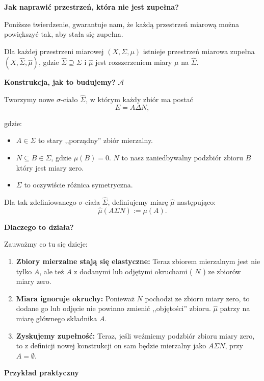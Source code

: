 \noindent\textbf{Jak naprawić przestrzeń, która nie jest zupełna?} 

Poniższe twierdzenie, gwarantuje nam, że każdą przestrzeń miarową można powiększyć tak, aby stała się zupełna.
\begin{theorem}
	Dla każdej przestrzeni miarowej $\left( X,\Sigma, \mu \right) $ istnieje przestrzeń miarowa zupełna $\left( X, \hat{\Sigma}, \hat{\mu} \right) $, gdzie $\hat{\Sigma}\supseteq \Sigma$ i $\hat{\mu}$ jest rozszerzeniem miary  $\mu$ na $\hat{\Sigma}.$
\end{theorem} 

\noindent \textbf{Konstrukcja, jak to budujemy?} $\mathcal{A} $

Tworzymy nowe $\sigma $-ciało $\hat{\Sigma }$, w którym każdy zbiór ma postać
\[
E = A \Delta N
,\]

gdzie:
\begin{itemize}
	\item $A \in \Sigma $ to stary ,,porządny'' zbiór mierzalny.
	\item $N \subseteq  B \in \Sigma $, gdzie $\mu\left( B \right) = 0$. $N$ to nasz zaniedbywalny podzbiór zbioru $B$ który jest miary zero.
	\item $\Sigma $ to oczywiście różnica symetryczna.
\end{itemize}

Dla tak zdefiniowanego $\sigma $-ciała $\hat{\Sigma }$, definiujemy miarę $\hat{\mu}$ następująco:
\[
\hat{\mu}\left( A \Sigma N \right) := \mu\left( A \right) 
.\] 

\noindent \textbf{Dlaczego to działa?} 

Zauważmy co tu się dzieje:
\begin{enumerate}[label=\arabic*.]
	\item \textbf{Zbiory mierzalne stają się elastyczne:} Teraz zbiorem mierzalnym jest nie tylko $A$, ale też $A$ z dodanymi lub odjętymi okruchami ( $N$ ) ze zbiorów miary zero.
	\item \textbf{Miara ignoruje okruchy:} Ponieważ $N$ pochodzi ze zbioru miary zero, to dodane go lub odjęcie nie powinno zmienić ,,objętości'' zbioru. $\hat{\mu}$ patrzy na miarę głównego składnika $A$.
	\item \textbf{Zyskujemy zupełność:} Teraz, jeśli weźmiemy podzbiór zbioru miary zero, to z definicji nowej konstrukcji on sam będzie mierzalny jako $A \Sigma N$, przy $A = \emptyset $.
\end{enumerate}

\noindent \textbf{Przykład praktyczny}

